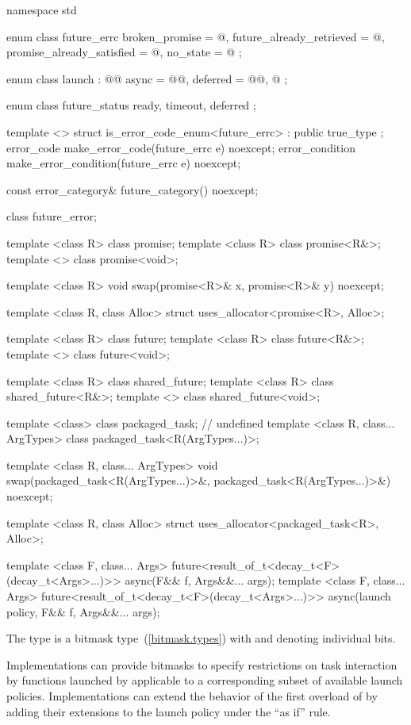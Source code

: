 \begin{codeblock}
namespace std {
  enum class future_errc {
    broken_promise = @\impdef@,
    future_already_retrieved = @\impdef@,
    promise_already_satisfied = @\impdef@,
    no_state = @\impdef@
  };

  enum class launch : @\unspec{}@ {
    async = @\unspec{}@,
    deferred = @\unspec{}@,
    @\impdef@
  };

  enum class future_status {
    ready,
    timeout,
    deferred
  };

  template <> struct is_error_code_enum<future_errc> : public true_type { };
  error_code make_error_code(future_errc e) noexcept;
  error_condition make_error_condition(future_errc e) noexcept;

  const error_category& future_category() noexcept;

  class future_error;

  template <class R> class promise;
  template <class R> class promise<R&>;
  template <> class promise<void>;

  template <class R>
    void swap(promise<R>& x, promise<R>& y) noexcept;

  template <class R, class Alloc>
    struct uses_allocator<promise<R>, Alloc>;

  template <class R> class future;
  template <class R> class future<R&>;
  template <> class future<void>;

  template <class R> class shared_future;
  template <class R> class shared_future<R&>;
  template <> class shared_future<void>;

  template <class> class packaged_task;   // undefined
  template <class R, class... ArgTypes>
    class packaged_task<R(ArgTypes...)>;

  template <class R, class... ArgTypes>
    void swap(packaged_task<R(ArgTypes...)>&, packaged_task<R(ArgTypes...)>&) noexcept;

  template <class R, class Alloc>
    struct uses_allocator<packaged_task<R>, Alloc>;

  template <class F, class... Args>
    future<result_of_t<decay_t<F>(decay_t<Args>...)>>
    async(F&& f, Args&&... args);
  template <class F, class... Args>
    future<result_of_t<decay_t<F>(decay_t<Args>...)>>
    async(launch policy, F&& f, Args&&... args);
}
\end{codeblock}

\pnum
The  type  is a bitmask type~(\ref{bitmask.types}) with
 and  denoting individual bits.
\begin{note} Implementations can provide bitmasks to specify restrictions on task
interaction by functions launched by  applicable to a
corresponding subset of available launch policies. Implementations can extend
the behavior of the first overload of  by adding their extensions
to the launch policy under the ``as if'' rule. \end{note}

